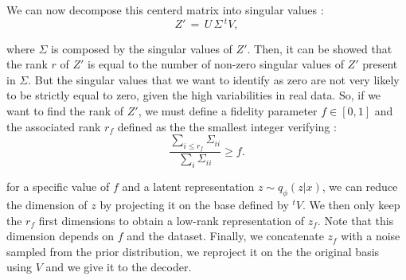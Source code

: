 \documentclass{article}
\begin{document}
We can now decompose this centerd matrix into singular values :
\begin{equation}
    Z'\,=\, U\, \Sigma \,^tV,
\end{equation}

where $\Sigma$ is composed by the singular values of $Z'$.
Then, it can be showed that the rank $r$ of $Z'$ is equal to the number of non-zero singular values of $Z'$ present in $\Sigma$. But the singular values that we want to identify as zero are not very likely to be strictly equal to zero, given the high variabilities in real data. So, if we want to find the rank of $Z'$, we must define a fidelity parameter $f \in [0,1]$ and the associated rank $r_f$ defined as the the smallest integer verifying :
\begin{equation}
    \frac{\sum_{i \leq r_f} \Sigma_{ii}}{\sum_i \Sigma_{ii}} \geq f.
\end{equation}

for a specific value of $f$ and a latent representation $z \sim q_\phi (z|x)$, we can reduce the dimension of $z$ by projecting it on the base defined by $^tV$. We then only keep the $r_f$ first dimensions to obtain a low-rank representation of $z_f$. Note that this dimension depends on $f$ and the dataset. Finally, we concatenate $z_f$ with a noise sampled from the prior distribution, we reproject it on the the original basis using $V$ and we give it to the decoder.

\end{document}
